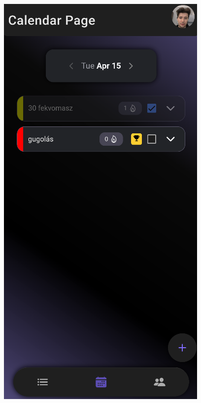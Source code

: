 \documentclass[12pt]{report}
\begin{document}
\begin{figure}[H]
\begin{minipage}[b]{0.3\textwidth}
        \includegraphics[width=\linewidth]{src/challenge7.png}
    \end{minipage}
    \hfill
    \begin{minipage}[b]{0.3\textwidth}

\end{minipage}
\end{figure}
\end{document}
